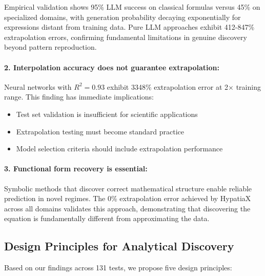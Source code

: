 Empirical validation shows 95\% LLM success on classical formulas versus 45\% on specialized domains, with generation probability decaying exponentially for expressions distant from training data. Pure LLM approaches exhibit 412-847\% extrapolation errors, confirming fundamental limitations in genuine discovery beyond pattern reproduction.

\paragraph{2. Interpolation accuracy does not guarantee extrapolation:}

Neural networks with $R^2 = 0.93$ exhibit 3348\% extrapolation error at 2$\times$ training range. This finding has immediate implications:
\begin{itemize}
\item Test set validation is insufficient for scientific applications
\item Extrapolation testing must become standard practice
\item Model selection criteria should include extrapolation performance
\end{itemize}

\paragraph{3. Functional form recovery is essential:}

Symbolic methods that discover correct mathematical structure enable reliable prediction in novel regimes. The 0\% extrapolation error achieved by HypatiaX across all domains validates this approach, demonstrating that discovering the equation is fundamentally different from approximating the data.

\subsection{Design Principles for Analytical Discovery}

Based on our findings across 131 tests, we propose five design principles:

